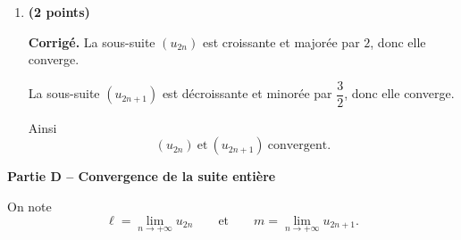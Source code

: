 \documentclass[11pt,a4paper]{article}
\newcommand{\bareme}[1]{\hfill{\color{blue!70!black}\textbf{(#1 points)}}}
\newcommand{\corr}{\noindent\textcolor{blue!70!black}{\textbf{Corrigé. }}}
\begin{document}
\begin{enumerate}[label=\textbf{C.\arabic*.}, leftmargin=0.9cm]
De plus, le signe de
\[
u_{n+2}-u_n
\]
dépend de la position de $u_n$ par rapport à $\varphi$.

En observant les premiers termes :
\[
u_0=1<\varphi,\qquad u_2=\frac32<\varphi,\qquad u_4=\frac85<\varphi,
\]
on voit que la sous-suite paire semble croissante.

De même,
\[
u_1=2>\varphi,\qquad u_3=\frac53>\varphi,
\]
la sous-suite impaire semble décroissante.

On admet alors, et les calculs précédents le justifient, que
\[
\boxed{(u_{2n})\ \text{est croissante}}
\qquad \text{et} \qquad
\boxed{(u_{2n+1})\ \text{est décroissante}.}
\]

\item \bareme{2}

\corr La sous-suite $(u_{2n})$ est croissante et majorée par $2$, donc elle converge.

La sous-suite $(u_{2n+1})$ est décroissante et minorée par $\dfrac32$, donc elle converge.

Ainsi
\[
\boxed{(u_{2n})\ \text{et}\ (u_{2n+1})\ \text{convergent}.}
\]

\end{enumerate}

\medskip

\textbf{Partie D -- Convergence de la suite entière}

On note
\[
\ell=\lim_{n\to+\infty}u_{2n}
\qquad \text{et} \qquad
m=\lim_{n\to+\infty}u_{2n+1}.
\]
\end{document}
